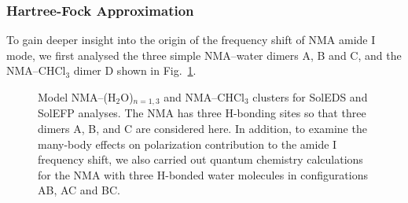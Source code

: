 \documentclass[a4paper,titlepage,twoside,fleqn,12pt]{book}
\begin{document}
\begin{refsection}
\subsubsection{Hartree-Fock Approximation}

To gain deeper insight into the origin of the frequency
shift of NMA amide I mode, we first analysed the three simple
NMA--water dimers A, B and C, and the NMA--CHCl$_3$ dimer D 
shown in Fig.~\ref{f:nma-abcde}. 
%
\begin{figure}[t!]
\centering
\setlength\fboxsep{0.4pt}
\setlength\fboxrule{0.5pt}
\caption{
Model NMA--(H$_2$O)$_{n = 1,3}$ and NMA--CHCl$_3$ clusters 
for SolEDS and SolEFP analyses. The NMA has three H-bonding sites so that three dimers A, B, and C are
considered here. In addition, to examine the many\hyp{}body effects on polarization contribution 
to the amide I frequency shift, we also carried out quantum
chemistry calculations for the NMA with three H-bonded water molecules in configurations
AB, AC and BC.
\label{f:nma-abcde}}
\end{figure}
%


\end{refsection}
\end{document}
